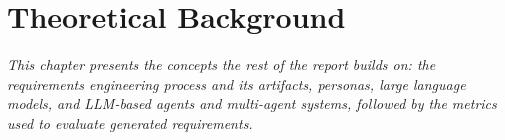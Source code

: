 \chapter{Theoretical Background}
\label{chap:background}
\textit{This chapter presents the concepts the rest of the report builds on: the requirements engineering process and its artifacts, personas, large language models, and LLM-based agents and multi-agent systems, followed by the metrics used to evaluate generated requirements.}







